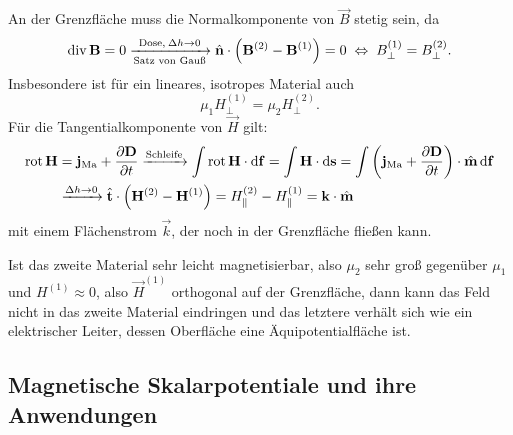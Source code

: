 An der Grenzfläche muss die Normalkomponente von $\vec {B}$ stetig sein, da
\begin{equation*}
	\operatorname{div} \mathbf{B}=0\xrightarrow[\text{Satz von Gau\ss }]{\text{Dose},\: \Delta  h\rightarrow 0}\hat{\mathbf{n}}\cdot \left(\mathbf{B}^{\left(2\right)}-\mathbf{B}^{\left(1\right)}\right)=0\;\Leftrightarrow\; B_{\perp }^{\left(1\right)}=B_{\perp }^{\left(2\right)}.
\end{equation*}
Insbesondere ist für ein lineares, isotropes Material auch
\begin{equation*}
	\mu _{1}H_{\perp }^{\left(1\right)}=\mu _{2}H_{\perp }^{\left(2\right)}.
\end{equation*}
Für die Tangentialkomponente von $\vec {H}$ gilt:
\begin{align*}
	\operatorname{rot} \mathbf{H} & =\mathbf{j}_{\mathrm{Ma}}+\frac{\partial \mathbf{D}}{\partial t}\xrightarrow{\text{Schleife}} \int \operatorname{rot} \mathbf{H}\cdot \mathop{}\!\mathrm{d} \mathbf{f}=\int \mathbf{H}\cdot \mathop{}\!\mathrm{d} \mathbf{s}=\int \left(\mathbf{j}_{\mathrm{Ma}}+\frac{\partial \mathbf{D}}{\partial t}\right)\cdot \hat{\mathbf{m}}\mathop{}\!\mathrm{d} \mathbf{f} \\
	              & \xrightarrow{\Delta  h\rightarrow 0}\hat{\mathbf{t}}\cdot \left(\mathbf{H}^{\left(2\right)}-\mathbf{H}^{\left(1\right)}\right)=H_{\parallel }^{\left(2\right)}-H_{\parallel }^{\left(1\right)}=\mathbf{k}\cdot \hat{\mathbf{m}}
\end{align*}
mit einem Flächenstrom $\vec {k}$, der noch in der Grenzfläche fließen kann.

Ist das zweite Material sehr leicht magnetisierbar, also $\mu _{2}$ sehr groß gegenüber $\mu _{1}$ und $H^{\left(1\right)}\approx 0$, also $\vec {H}^{\left(1\right)}$ orthogonal auf der Grenzfläche, dann kann das Feld nicht in das zweite Material eindringen und das letztere verhält sich wie ein elektrischer Leiter, dessen Oberfläche eine Äquipotentialfläche ist.

\subsection{Magnetische Skalarpotentiale und ihre Anwendungen}

